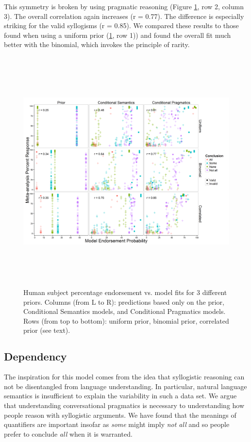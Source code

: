 \documentclass[10pt,letterpaper]{article}
\begin{document}
This symmetry is broken by using pragmatic reasoning (Figure \ref{fig:megaScatter}, row 2, column 3). The overall correlation again increases (r = 0.77). The difference is especially striking for the valid syllogisms (r = 0.85). We compared these results to those found when using a uniform prior (\ref{fig:megaScatter}, row 1)) and found the overall fit much better with the binomial, which invokes the principle of rarity. 

\begin{figure}[t!] %
\centering
	\subfigure
		\centering
  \includegraphics[width=\textwidth,height=12.5cm]{fig2_multiScatter_unif-bin-2m40br_n6_alphabefore2}
  \caption{Human subject percentage endorsement vs. model fits for 3 different priors. 
  Columns (from L to R): predictions based only on the prior, Conditional Semantics models, and Conditional Pragmatics models.
  Rows (from top to bottom): uniform prior, binomial prior, correlated prior (see text).}
  \label{fig:megaScatter}

\end{figure}

\subsection{Dependency}

The inspiration for this model comes from the idea that syllogistic reasoning can not be disentangled from language understanding. In particular, natural language semantics is insufficient to explain the variability in such a data set. We argue that understanding conversational pragmatics is necessary to understanding how people reason with syllogistic arguments. We have found that the meanings of quantifiers are important insofar as \emph{some} might imply \emph{not all} and so people prefer to conclude \emph{all} when it is warranted. 
\end{document}
